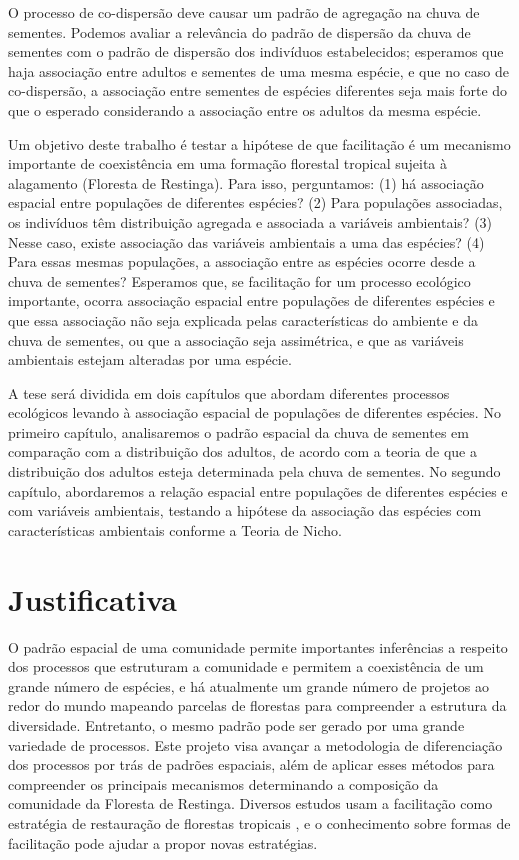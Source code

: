 \documentclass[twoside,12pt,a4paper]{report}
\begin{document}
O processo de co-dispersão deve causar um padrão de agregação na chuva de sementes. Podemos avaliar
a relevância do padrão de dispersão da chuva de sementes com o padrão de dispersão dos indivíduos
estabelecidos; esperamos que haja associação entre adultos e sementes de uma mesma espécie, e que no
caso de co-dispersão, a associação entre sementes de espécies diferentes seja mais forte do que o
esperado considerando a associação entre os adultos da mesma espécie.

Um objetivo deste trabalho é testar a hipótese de que facilitação é um mecanismo importante de
coexistência em uma formação florestal tropical sujeita à alagamento (Floresta de Restinga). Para
isso, perguntamos: (1) há associação espacial entre populações de diferentes espécies? (2) Para
populações associadas, os indivíduos têm distribuição agregada e associada a variáveis ambientais?
(3) Nesse caso, existe associação das variáveis ambientais a uma das espécies? (4) Para essas mesmas
populações, a associação entre as espécies ocorre desde a chuva de sementes? Esperamos que, se
facilitação for um processo ecológico importante, ocorra associação espacial entre populações de
diferentes espécies e que essa associação não seja explicada pelas características do ambiente e da
chuva de sementes, ou que a associação seja assimétrica, e que as variáveis ambientais estejam
alteradas por uma espécie.

A tese será dividida em dois capítulos que abordam diferentes processos ecológicos levando à
associação espacial de populações de diferentes espécies. No primeiro capítulo, analisaremos o
padrão espacial da chuva de sementes em comparação com a distribuição dos adultos, de acordo com a
teoria de que a distribuição dos adultos esteja determinada pela chuva de sementes. No segundo
capítulo, abordaremos a relação espacial entre populações de diferentes espécies e com variáveis
ambientais, testando a hipótese da associação das espécies com características ambientais conforme a
Teoria de Nicho.


\section{Justificativa}

O padrão espacial de uma comunidade permite importantes inferências a respeito dos processos que
estruturam a comunidade e permitem a coexistência de um grande número de espécies, e há atualmente
um grande número de projetos ao redor do mundo mapeando parcelas de florestas para compreender a
estrutura da diversidade. Entretanto, o mesmo padrão pode ser gerado por uma grande variedade de
processos. Este projeto visa avançar a metodologia de diferenciação dos processos por trás de
padrões espaciais, além de aplicar esses métodos para compreender os principais mecanismos
determinando a composição da comunidade da Floresta de Restinga. Diversos estudos usam a facilitação
como estratégia de restauração de florestas tropicais \citep{Zwiener2014,ref}, e o
conhecimento sobre formas de facilitação pode ajudar a propor novas estratégias.
\end{document}
